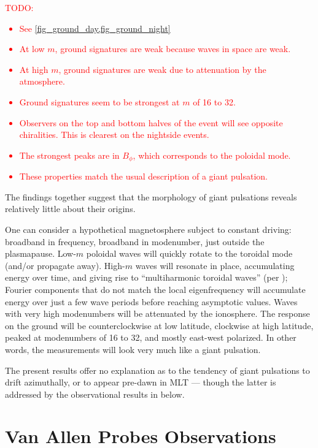 \documentclass{article}
\newcommand{\todo}[1]{ \textcolor{red}{TODO: #1} }
\newcommand{\azm}{\ensuremath{m}\xspace}
\begin{document}
\todo{
\begin{itemize}
    \item See \cref{fig_ground_day,fig_ground_night}
    \item At low \azm, ground signatures are weak because waves in space are weak.
    \item At high \azm, ground signatures are weak due to attenuation by the atmosphere.
    \item Ground signatures seem to be strongest at \azm of 16 to 32.
    \item Observers on the top and bottom halves of the event will see opposite chiralities. This is clearest on the nightside events.
    \item The strongest peaks are in $B_\phi$, which corresponds to the poloidal mode.
    \item These properties match the usual description of a giant pulsation.
\end{itemize}
}

The findings together suggest that the morphology of giant pulsations reveals relatively little about their origins.

One can consider a hypothetical magnetosphere subject to constant driving: broadband in frequency, broadband in modenumber, just outside the plasmapause. Low-\azm poloidal waves will quickly rotate to the toroidal mode (and/or propagate away). High-\azm waves will resonate in place, accumulating energy over time, and giving rise to ``multiharmonic toroidal waves'' (per \cite{takahashi_2011}); Fourier components that do not match the local eigenfrequency will accumulate energy over just a few wave periods before reaching asymptotic values. Waves with very high modenumbers will be attenuated by the ionosphere. The response on the ground will be counterclockwise at low latitude, clockwise at high latitude, peaked at modenumbers of 16 to 32, and mostly east-west polarized. In other words, the measurements will look very much like a giant pulsation.

The present results offer no explanation as to the tendency of giant pulsations to drift azimuthally, or to appear pre-dawn in MLT --- though the latter is addressed by the observational results in below.


\section{Van Allen Probes Observations}
\end{document}
